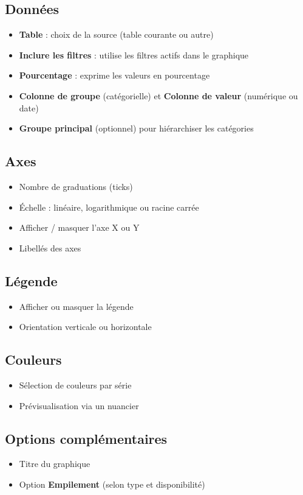 \documentclass[11pt, a4paper]{article}
\begin{document}
\subsection{Données}
\begin{itemize}
    \item \textbf{Table} : choix de la source (table courante ou autre)
    \item \textbf{Inclure les filtres} : utilise les filtres actifs dans le graphique
    \item \textbf{Pourcentage} : exprime les valeurs en pourcentage
    \item \textbf{Colonne de groupe} (catégorielle) et \textbf{Colonne de valeur} (numérique ou date)
    \item \textbf{Groupe principal} (optionnel) pour hiérarchiser les catégories
\end{itemize}

\subsection{Axes}
\begin{itemize}
    \item Nombre de graduations (ticks)
    \item Échelle : linéaire, logarithmique ou racine carrée
    \item Afficher / masquer l'axe X ou Y
    \item Libellés des axes
\end{itemize}

\subsection{Légende}
\begin{itemize}
    \item Afficher ou masquer la légende
    \item Orientation verticale ou horizontale
\end{itemize}

\subsection{Couleurs}
\begin{itemize}
    \item Sélection de couleurs par série
    \item Prévisualisation via un nuancier
\end{itemize}

\subsection{Options complémentaires}
\begin{itemize}
    \item Titre du graphique
    \item Option \textbf{Empilement} (selon type et disponibilité)
\end{itemize}
\end{document}
